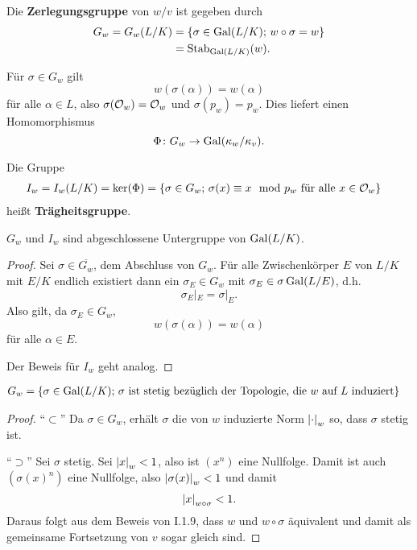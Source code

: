 \begin{defi}
	Die \textbf{Zerlegungsgruppe} von $w/v$ ist gegeben durch
	\begin{align*}
	G_w
	=G_w(L/K)
	&= \left\{ \sigma \in \operatorname{Gal}(L/K); \, w\circ\sigma = w \right\} \\
	&= \operatorname{Stab}_{\operatorname{Gal}(L/K)}(w).
	\end{align*}
\end{defi}

\begin{Bem}
	Für $\sigma \in G_w$ gilt
	\[ w(\sigma(\alpha)) = w(\alpha)
	\]
	für alle $\alpha \in L$, also $\sigma(\mathcal{O}_w) = \mathcal{O}_w$ und $\sigma(p_w) = p_w$.
	Dies liefert einen Homomorphismus
	\[ \Phi \colon G_w \to \operatorname{Gal}(\kappa_w/\kappa_v).
	\]
\end{Bem}

\begin{defi} Die Gruppe
	\begin{align*}
	I_w 
	=I_w(L/K)
	&= \ker(\Phi)= \left\{
	\sigma \in G_w; \, \sigma(x) \equiv x \mod p_w \text{ für alle } x \in \mathcal{O}_w
	\right\}
	\end{align*}
	heißt \textbf{Trägheitsgruppe}.
\end{defi}


\begin{Prop}
	$G_w$ und $I_w$ sind abgeschlossene Untergruppe von $\operatorname{Gal}(L/K)$.
\end{Prop}


\begin{proof}
	Sei $\sigma \in \overline{G_w}$, dem Abschluss von $G_w$. Für alle Zwischenkörper $E$ von $L/K$ mit $E/K$ endlich existiert dann ein $\sigma_E \in G_w$ mit
	$\sigma_E \in \sigma \operatorname{Gal}(L/E)$, d.h.
	\[ \sigma_E|_E = \sigma|_E.
	\]
	Also gilt, da $\sigma_E \in G_w$,
	\[ w(\sigma(\alpha)) = w(\alpha)
	\]
	für alle $\alpha \in E$.
	
	\bigskip
	Der Beweis für $I_w$ geht analog.
\end{proof}

\begin{Prop}
	\begin{align*}
	G_w
	&=
	\left\{ 
	\sigma \in \operatorname{Gal}(L/K); \,\text{$\sigma$ ist stetig bezüglich der Topologie, die $w$ auf $L$ induziert}
	\right\}
	\end{align*}
\end{Prop}

\begin{proof}
	\enquote{$\subset$} Da $\sigma \in G_w$, erhält $\sigma$ die von $w$ induzierte Norm $\left|{\cdot}\right|_w$ so, dass $\sigma$ stetig ist.
	
	\bigskip \enquote{$\supset$} Sei $\sigma$ stetig. Sei $\left|{x}\right|_w < 1$, also ist $(x^n)$ eine Nullfolge. Damit ist auch $(\sigma(x)^n)$ eine Nullfolge, also
	$\left|{\sigma(x)}\right|_w <1$ und damit
	\[ \left|{x}\right|_{w\circ \sigma} < 1.
	\]
	Daraus folgt aus dem Beweis von I.1.9, dass $w$ und $w\circ\sigma$ äquivalent und damit als gemeinsame Fortsetzung von $v$ sogar gleich sind.
\end{proof}


